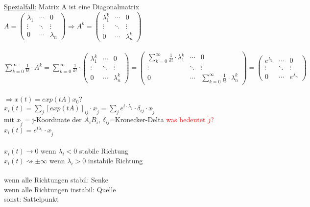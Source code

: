 \underline{Spezialfall:} Matrix A ist eine Diagonalmatrix\\

$A = 
\begin{pmatrix}
 \lambda_1 & \cdots & 0 \\
 \vdots  & \ddots & \vdots  \\
 0 & \cdots & \lambda_n
\end{pmatrix}
\Rightarrow
A^k = 
\begin{pmatrix}
 \lambda_1^k & \cdots & 0 \\
 \vdots  & \ddots & \vdots  \\
 0 & \cdots & \lambda_n^k
\end{pmatrix}$
\\\\

$\displaystyle \sum_{k=0}^{\infty} \frac{1}{k!} \cdot A^k=\displaystyle  \sum_{k=0}^{\infty} \frac{1}{k!} \cdot  
\begin{pmatrix}
 \lambda_1^k & \cdots & 0 \\
 \vdots  & \ddots & \vdots  \\
 0 & \cdots & \lambda_n^k
\end{pmatrix} = 
\begin{pmatrix}
 \sum_{k=0}^{\infty} \frac{1}{k!} \cdot \lambda_1^k & \cdots & 0 \\
 \vdots  & \ddots & \vdots  \\
 0 & \cdots & \sum_{k=0}^{\infty} \frac{1}{k!} \cdot \lambda_n^k
\end{pmatrix} = 
\begin{pmatrix}
 e^{\lambda_1} & \cdots & 0 \\
 \vdots  & \ddots & \vdots  \\
 0 & \cdots & e^{\lambda_n}
\end{pmatrix}
$
\\\\

$\Rightarrow x(t)=exp(tA)x_0$?\\
$x_i(t)=\sum_{j} [exp(tA)]_{ij} \cdot x_{\mathring{j}} = \sum_{j} e^{t \cdot \lambda_j} \cdot \delta_{ij} \cdot x_{\mathring{j}}$\\
mit $x_{\mathring{j}}=$j-Koordinate der $A_iB_i$, $\delta_{ij}$=Kronecker-Delta \textcolor{red}{was bedeutet $\mathring{j}$?}\\

$x_i(t)=e^{t \lambda_i} \cdot x_{\mathring{j}}$
\\\\
$x_i(t) \rightarrow 0$ wenn $\lambda_i < 0$ stabile Richtung\\
$x_i(t) \rightsquigarrow \pm \infty$ wenn $\lambda_i > 0$ instabile Richtung\\\\
wenn alle Richtungen stabil: Senke\\
wenn alle Richtungen instabil: Quelle\\
sonst: Sattelpunkt\\

